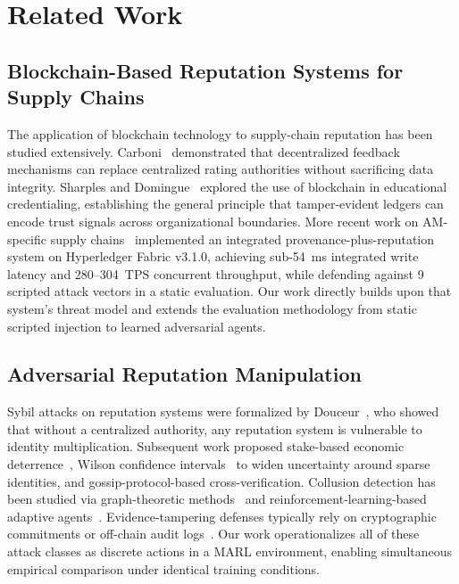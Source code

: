 \section{Related Work}
\label{sec:related}

\subsection{Blockchain-Based Reputation Systems for Supply Chains}

The application of blockchain technology to supply-chain reputation has been
studied extensively.  Carboni~\cite{carboni2015feedback} demonstrated that
decentralized feedback mechanisms can replace centralized rating authorities
without sacrificing data integrity.  Sharples and Domingue~\cite{sharples2016blockchain}
explored the use of blockchain in educational credentialing, establishing
the general principle that tamper-evident ledgers can encode trust signals
across organizational boundaries.  More recent work on AM-specific supply
chains~\cite{almaayn2024unified} implemented an integrated provenance-plus-reputation
system on Hyperledger Fabric v3.1.0, achieving sub-54~ms integrated write
latency and 280--304~TPS concurrent throughput, while defending against 9
scripted attack vectors in a static evaluation.  Our work directly builds
upon that system's threat model and extends the evaluation methodology from
static scripted injection to learned adversarial agents.

\subsection{Adversarial Reputation Manipulation}

Sybil attacks on reputation systems were formalized by Douceur~\cite{douceur2002sybil},
who showed that without a centralized authority, any reputation system is
vulnerable to identity multiplication.  Subsequent work proposed stake-based
economic deterrence~\cite{levien2009attack}, Wilson confidence
intervals~\cite{wilson1927probable} to widen uncertainty around sparse
identities, and gossip-protocol-based cross-verification.  Collusion
detection has been studied via graph-theoretic methods~\cite{christodoulou2019collusion}
and reinforcement-learning-based adaptive agents~\cite{ganesh2019reinforcement}.
Evidence-tampering defenses typically rely on cryptographic commitments or
off-chain audit logs~\cite{ferretti2021blockchain}.  Our work operationalizes
all of these attack classes as discrete actions in a MARL environment,
enabling simultaneous empirical comparison under identical training conditions.

